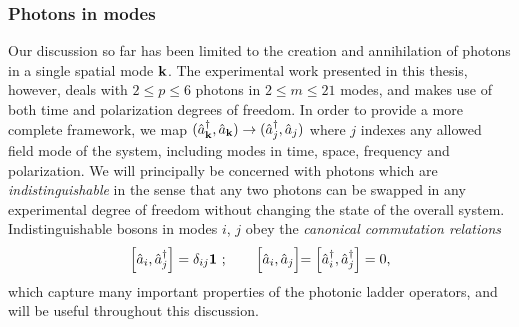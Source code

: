 \subsubsection{Photons in modes} 
Our discussion so far has been limited to the creation and annihilation of photons in a single spatial mode $\mathbf{k}$. The experimental work presented in this thesis, however, deals with $2\le p\le6$ photons in $2 \le m \le21$ modes, and makes use of both time and polarization degrees of freedom. In order to provide a more complete framework, we map $(\hat{a}^{\dagger}_{\mathbf{k}}, \hat{a}_{\mathbf{k}}) \rightarrow (\hat{a}^{\dagger}_j, \hat{a}_j)$ where $j$ indexes any allowed field mode of the system, including modes in time, space, frequency and polarization.  
We will principally be concerned with photons which are \emph{indistinguishable} in the sense that any two photons can be swapped in any experimental degree of freedom without changing the state of the overall system.
Indistinguishable bosons in modes $i$, $j$ obey the \emph{canonical commutation relations}
\begin{gather}
    \left[ \hat{a}_i, \hat{a}^{\dagger}_j \right]  = \delta_{ij} \mathbf{1} ~;\qquad
    \Bigl[ \hat{a}_i, \hat{a}_j \Bigl]  
    = \left[ \hat{a}^{\dagger}_i, \hat{a}^{\dagger}_j \right]  = 0,
    \label{eqn:canonical-commutation-relations}
\end{gather}
which capture many important properties of the photonic ladder operators, and will be useful throughout this discussion.

